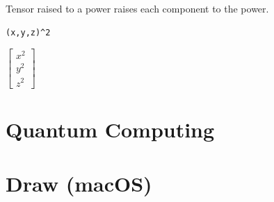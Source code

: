 \documentclass[12pt]{article}
\begin{document}
\bigskip
\noindent
Tensor raised to a power raises each component to the power.

{\color{blue}\begin{verbatim}
(x,y,z)^2
\end{verbatim}}

\noindent
$\begin{bmatrix}x^2\\y^2\\z^2\end{bmatrix}$

\newpage

















\newpage

\section{Quantum Computing}



\newpage

\section{Draw (macOS)}



\newpage



\newpage


\end{document}
